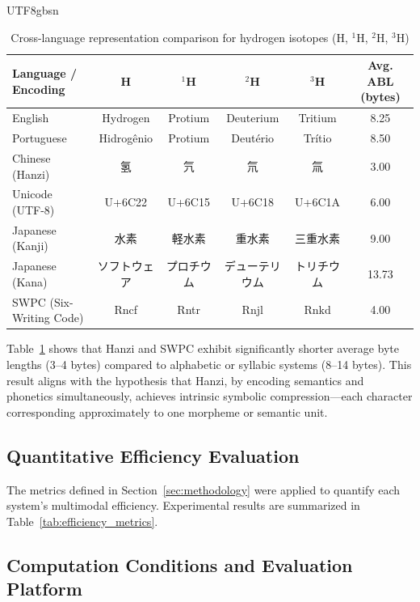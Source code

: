 \documentclass[conference]{IEEEtran}
\begin{document}
\begin{CJK*}{UTF8}{gbsn}
\begin{table}[htbp]
\centering
\caption{Cross-language representation comparison for hydrogen isotopes (H, $^{1}$H, $^{2}$H, $^{3}$H)}
\label{tab:isotope_comparison}
\footnotesize
\renewcommand{\arraystretch}{1.2}
\begin{tabular}{lccccc}
\toprule
\textbf{Language / Encoding} & \textbf{H} & \textbf{$^{1}$H} & \textbf{$^{2}$H} & \textbf{$^{3}$H} & \textbf{Avg. ABL (bytes)} \\
\midrule
English & Hydrogen & Protium & Deuterium & Tritium & 8.25 \\
Portuguese & Hidrogênio & Protium & Deutério & Trítio & 8.50 \\
Chinese (Hanzi) & 氢 & 氕 & 氘 & 氚 & 3.00 \\
Unicode (UTF-8) & U+6C22 & U+6C15 & U+6C18 & U+6C1A & 6.00 \\
Japanese (Kanji) & 水素 & 軽水素 & 重水素 & 三重水素 & 9.00 \\
Japanese (Kana) & ソフトウェア & プロチウム & デューテリウム & トリチウム & 13.73 \\
SWPC (Six-Writing Code) & Rncf & Rntr & Rnjl & Rnkd & 4.00 \\
\bottomrule
\end{tabular}
\end{table}



Table~\ref{tab:isotope_comparison} shows that Hanzi and SWPC exhibit significantly shorter average byte lengths (3–4 bytes) compared to alphabetic or syllabic systems (8–14 bytes).  
This result aligns with the hypothesis that Hanzi, by encoding semantics and phonetics simultaneously, achieves intrinsic symbolic compression—each character corresponding approximately to one morpheme or semantic unit.

\subsection{Quantitative Efficiency Evaluation}

The metrics defined in Section~\ref{sec:methodology} were applied to quantify each system’s multimodal efficiency.  
Experimental results are summarized in Table~\ref{tab:efficiency_metrics}.

\subsection{Computation Conditions and Evaluation Platform}


\end{CJK*}
\end{document}

